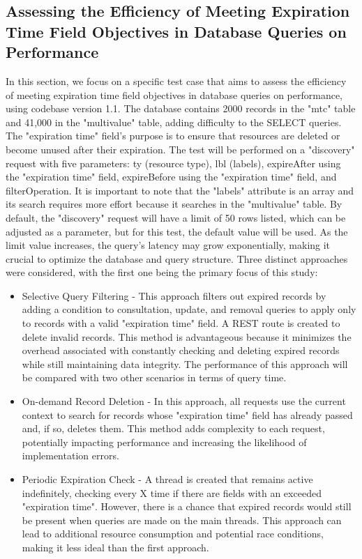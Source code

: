 \documentclass[a4paper,fleqn]{cas-dc}
\begin{document}
\subsection{Assessing the Efficiency of Meeting Expiration Time Field Objectives in Database Queries on Performance}

In this section, we focus on a specific test case that aims to assess the efficiency of meeting expiration time field objectives in database queries on performance, using codebase version 1.1. The database contains 2000 records in the "mtc" table and 41,000 in the "multivalue" table, adding difficulty to the SELECT queries. The "expiration time" field's purpose is to ensure that resources are deleted or become unused after their expiration. The test will be performed on a "discovery" request with five parameters: ty (resource type), lbl (labels), expireAfter using the "expiration time" field, expireBefore using the "expiration time" field, and filterOperation. It is important to note that the "labels" attribute is an array and its search requires more effort because it searches in the "multivalue" table. By default, the "discovery" request will have a limit of 50 rows listed, which can be adjusted as a parameter, but for this test, the default value will be used. As the limit value increases, the query's latency may grow exponentially, making it crucial to optimize the database and query structure. Three distinct approaches were considered, with the first one being the primary focus of this study:

\begin{itemize}
	\item Selective Query Filtering - This approach filters out expired records by adding a condition to consultation, update, and removal queries to apply only to records with a valid "expiration time" field. A REST route is created to delete invalid records. This method is advantageous because it minimizes the overhead associated with constantly checking and deleting expired records while still maintaining data integrity. The performance of this approach will be compared with two other scenarios in terms of query time.
	\item On-demand Record Deletion - In this approach, all requests use the current context to search for records whose "expiration time" field has already passed and, if so, deletes them. This method adds complexity to each request, potentially impacting performance and increasing the likelihood of implementation errors.
	\item Periodic Expiration Check - A thread is created that remains active indefinitely, checking every X time if there are fields with an exceeded "expiration time". However, there is a chance that expired records would still be present when queries are made on the main threads. This approach can lead to additional resource consumption and potential race conditions, making it less ideal than the first approach.
\end{itemize}
\end{document}
